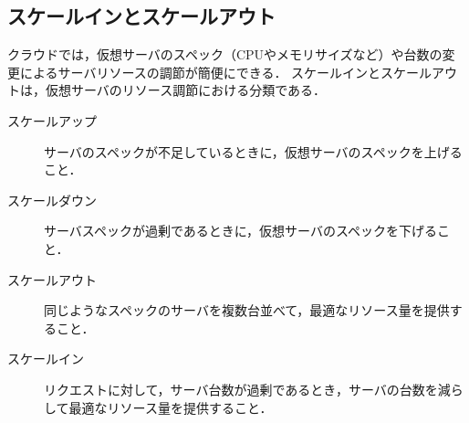 \subsection{スケールインとスケールアウト}
クラウドでは，仮想サーバのスペック（CPUやメモリサイズなど）や台数の変更によるサーバリソースの調節が簡便にできる．
スケールインとスケールアウトは，仮想サーバのリソース調節における分類である．
\begin{description}
    \item[スケールアップ] サーバのスペックが不足しているときに，仮想サーバのスペックを上げること．
    \item[スケールダウン] サーバスペックが過剰であるときに，仮想サーバのスペックを下げること．
    \item[スケールアウト] 同じようなスペックのサーバを複数台並べて，最適なリソース量を提供すること．
    \item[スケールイン] リクエストに対して，{{サーバ}}台数が過剰であるとき，{{サーバ}}の台数を減らして最適なリソース量を提供すること．\hfill\cite{スケールアップ}
\end{description}
